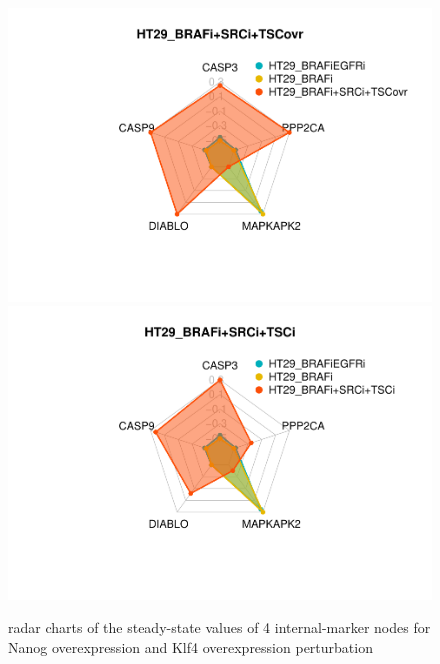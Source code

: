 \documentclass[
]{book}
\begin{document}
\begin{figure}
\includegraphics[width=0.5\linewidth]{_main_files/figure-latex/crc-chartsapop-1} \includegraphics[width=0.5\linewidth]{_main_files/figure-latex/crc-chartsapop-2} \caption{radar charts of the steady-state values of 4 internal-marker nodes for Nanog overexpression and Klf4 overexpression perturbation}\label{fig:crc-chartsapop}
\end{figure}
\end{document}
